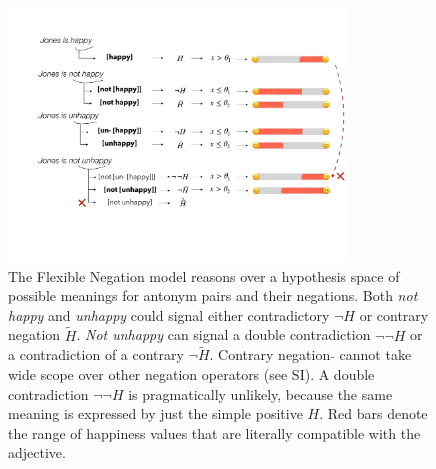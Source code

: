 \documentclass[floatsintext,doc]{apa6}
\newcommand{\ourmodel}{Flexible Negation\xspace}
\begin{document}
\begin{figure}[t]
\centering \includegraphics[width=0.8\textwidth]{figs/schematicMeanings}  
\caption{The \ourmodel model reasons over a hypothesis space of possible meanings for antonym pairs and their negations.
Both \emph{not happy} and \emph{unhappy} could signal either contradictory $\neg H$ or contrary negation $\tilde{H}$.
\emph{Not unhappy} can signal a double contradiction  $\neg \neg H$  or a contradiction of a contrary  $ \neg \tilde{H}$.
Contrary negation $\tilde{}$ cannot take wide scope over other negation operators (see SI). 
A double contradiction  $\neg \neg H$  is pragmatically unlikely, because the same meaning is expressed by just the simple positive $H$.
 Red bars denote the range of happiness values that are literally compatible with the adjective.
}
\label{fig:meanings}
\end{figure}
\end{document}
